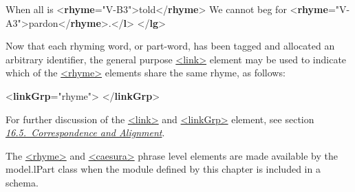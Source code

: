 \begin{shaded}
\mbox{}\newline 
{}When all is {<\textbf{rhyme}\hspace*{1em}{xml:id}="{V-B3}">}told{</\textbf{rhyme}>}\mbox{}\newline 
{}\mbox{}\newline 
{}We cannot beg for {<\textbf{rhyme}\hspace*{1em}{xml:id}="{V-A3}">}pardon{</\textbf{rhyme}>}.{</\textbf{l}>}\mbox{}\newline 
{</\textbf{lg}>}\end{shaded}\egroup\par \noindent  Now that each rhyming word, or part-word, has been tagged and allocated an arbitrary identifier, the general purpose \hyperref[TEI.link]{<link>} element may be used to indicate which of the \hyperref[TEI.rhyme]{<rhyme>} elements share the same rhyme, as follows: \par\bgroup{}\exampleFont \begin{shaded}\noindent\mbox{}{<\textbf{linkGrp}\hspace*{1em}{type}="{rhyme}">}\mbox{}\newline 
{}\mbox{}\newline 
{}\mbox{}\newline 
{}\mbox{}\newline 
{</\textbf{linkGrp}>}\end{shaded}\egroup\par \par
For further discussion of the \hyperref[TEI.link]{<link>} and \hyperref[TEI.linkGrp]{<linkGrp>} element, see section \textit{\hyperref[SACS]{16.5.\ Correspondence and Alignment}}.\par
The \hyperref[TEI.rhyme]{<rhyme>} and \hyperref[TEI.caesura]{<caesura>} phrase level elements are made available by the \textsf{model.lPart} class when the module defined by this chapter is included in a schema.
